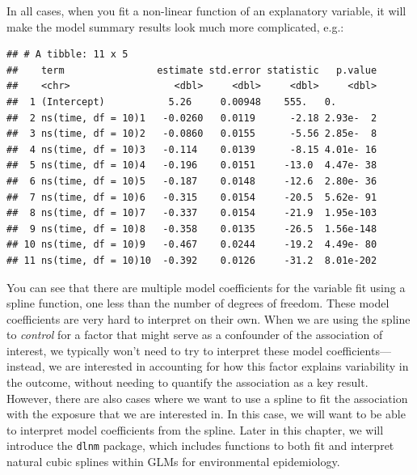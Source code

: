 \documentclass[
]{book}
\newenvironment{Shaded}{\begin{snugshade}}{\end{snugshade}}
\newcommand{\KeywordTok}[1]{\textcolor[rgb]{0.13,0.29,0.53}{\textbf{#1}}}
\newcommand{\NormalTok}[1]{#1}
\newcommand{\OperatorTok}[1]{\textcolor[rgb]{0.81,0.36,0.00}{\textbf{#1}}}
\newcommand{\StringTok}[1]{\textcolor[rgb]{0.31,0.60,0.02}{#1}}
\begin{document}
In all cases, when you fit a non-linear function of an explanatory variable,
it will make the model summary results look much more complicated, e.g.:

\begin{Shaded}
\end{Shaded}

\begin{verbatim}
## # A tibble: 11 x 5
##    term                estimate std.error statistic   p.value
##    <chr>                  <dbl>     <dbl>     <dbl>     <dbl>
##  1 (Intercept)           5.26     0.00948    555.   0.       
##  2 ns(time, df = 10)1   -0.0260   0.0119      -2.18 2.93e-  2
##  3 ns(time, df = 10)2   -0.0860   0.0155      -5.56 2.85e-  8
##  4 ns(time, df = 10)3   -0.114    0.0139      -8.15 4.01e- 16
##  5 ns(time, df = 10)4   -0.196    0.0151     -13.0  4.47e- 38
##  6 ns(time, df = 10)5   -0.187    0.0148     -12.6  2.80e- 36
##  7 ns(time, df = 10)6   -0.315    0.0154     -20.5  5.62e- 91
##  8 ns(time, df = 10)7   -0.337    0.0154     -21.9  1.95e-103
##  9 ns(time, df = 10)8   -0.358    0.0135     -26.5  1.56e-148
## 10 ns(time, df = 10)9   -0.467    0.0244     -19.2  4.49e- 80
## 11 ns(time, df = 10)10  -0.392    0.0126     -31.2  8.01e-202
\end{verbatim}

You can see that there are multiple model coefficients for the variable fit
using a spline function, one less than the number of degrees of freedom. These
model coefficients are very hard to interpret on their own. When we are using
the spline to \emph{control} for a factor that might serve as a confounder of the
association of interest, we typically won't need to try to interpret these
model coefficients---instead, we are interested in accounting for how this
factor explains variability in the outcome, without needing to quantify the
association as a key result. However, there are also cases where we want to
use a spline to fit the association with the exposure that we are interested
in. In this case, we will want to be able to interpret model coefficients from
the spline. Later in this chapter, we will introduce the \texttt{dlnm} package, which
includes functions to both fit and interpret natural cubic splines within
GLMs for environmental epidemiology.
\end{document}
